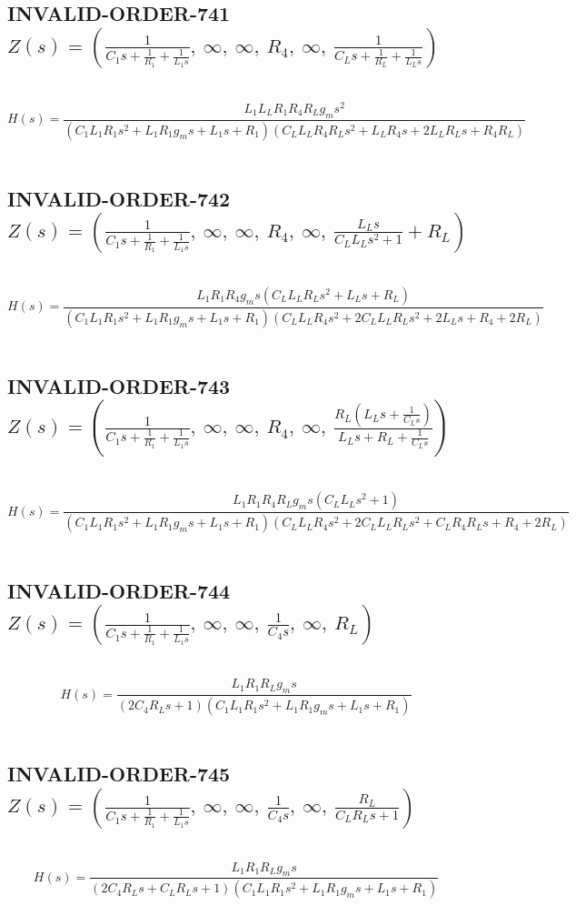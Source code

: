 \documentclass{article}
\begin{document}
\subsection{INVALID-ORDER-741 $Z(s) = \left( \frac{1}{C_{1} s + \frac{1}{R_{1}} + \frac{1}{L_{1} s}}, \  \infty, \  \infty, \  R_{4}, \  \infty, \  \frac{1}{C_{L} s + \frac{1}{R_{L}} + \frac{1}{L_{L} s}}\right)$ } \ 
\textbf{\[H(s) = \frac{L_{1} L_{L} R_{1} R_{4} R_{L} g_{m} s^{2}}{\left(C_{1} L_{1} R_{1} s^{2} + L_{1} R_{1} g_{m} s + L_{1} s + R_{1}\right) \left(C_{L} L_{L} R_{4} R_{L} s^{2} + L_{L} R_{4} s + 2 L_{L} R_{L} s + R_{4} R_{L}\right)}\] } \ 
\subsection{INVALID-ORDER-742 $Z(s) = \left( \frac{1}{C_{1} s + \frac{1}{R_{1}} + \frac{1}{L_{1} s}}, \  \infty, \  \infty, \  R_{4}, \  \infty, \  \frac{L_{L} s}{C_{L} L_{L} s^{2} + 1} + R_{L}\right)$ } \ 
\textbf{\[H(s) = \frac{L_{1} R_{1} R_{4} g_{m} s \left(C_{L} L_{L} R_{L} s^{2} + L_{L} s + R_{L}\right)}{\left(C_{1} L_{1} R_{1} s^{2} + L_{1} R_{1} g_{m} s + L_{1} s + R_{1}\right) \left(C_{L} L_{L} R_{4} s^{2} + 2 C_{L} L_{L} R_{L} s^{2} + 2 L_{L} s + R_{4} + 2 R_{L}\right)}\] } \ 
\subsection{INVALID-ORDER-743 $Z(s) = \left( \frac{1}{C_{1} s + \frac{1}{R_{1}} + \frac{1}{L_{1} s}}, \  \infty, \  \infty, \  R_{4}, \  \infty, \  \frac{R_{L} \left(L_{L} s + \frac{1}{C_{L} s}\right)}{L_{L} s + R_{L} + \frac{1}{C_{L} s}}\right)$ } \ 
\textbf{\[H(s) = \frac{L_{1} R_{1} R_{4} R_{L} g_{m} s \left(C_{L} L_{L} s^{2} + 1\right)}{\left(C_{1} L_{1} R_{1} s^{2} + L_{1} R_{1} g_{m} s + L_{1} s + R_{1}\right) \left(C_{L} L_{L} R_{4} s^{2} + 2 C_{L} L_{L} R_{L} s^{2} + C_{L} R_{4} R_{L} s + R_{4} + 2 R_{L}\right)}\] } \ 
\subsection{INVALID-ORDER-744 $Z(s) = \left( \frac{1}{C_{1} s + \frac{1}{R_{1}} + \frac{1}{L_{1} s}}, \  \infty, \  \infty, \  \frac{1}{C_{4} s}, \  \infty, \  R_{L}\right)$ } \ 
\textbf{\[H(s) = \frac{L_{1} R_{1} R_{L} g_{m} s}{\left(2 C_{4} R_{L} s + 1\right) \left(C_{1} L_{1} R_{1} s^{2} + L_{1} R_{1} g_{m} s + L_{1} s + R_{1}\right)}\] } \ 
\subsection{INVALID-ORDER-745 $Z(s) = \left( \frac{1}{C_{1} s + \frac{1}{R_{1}} + \frac{1}{L_{1} s}}, \  \infty, \  \infty, \  \frac{1}{C_{4} s}, \  \infty, \  \frac{R_{L}}{C_{L} R_{L} s + 1}\right)$ } \ 
\textbf{\[H(s) = \frac{L_{1} R_{1} R_{L} g_{m} s}{\left(2 C_{4} R_{L} s + C_{L} R_{L} s + 1\right) \left(C_{1} L_{1} R_{1} s^{2} + L_{1} R_{1} g_{m} s + L_{1} s + R_{1}\right)}\] } \ 
\end{document}
